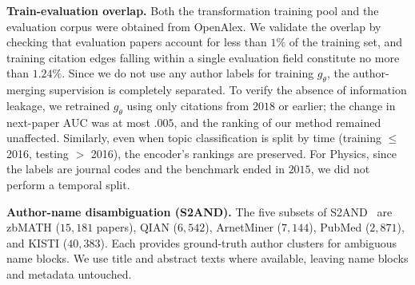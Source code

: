 \textbf{Train-evaluation overlap.}
Both the transformation training pool and the evaluation corpus were obtained from OpenAlex. 
We validate the overlap by checking that evaluation papers account for less than $1\%$ of the training set, and training citation edges falling within a single evaluation field constitute no more than $1.24\%$. Since we do not use any author labels for training $g_\theta$, the author-merging supervision is completely separated. To verify the absence of information leakage, we retrained $g_\theta$ using only citations from $2018$ or earlier; the change in next-paper AUC was at most $.005$, and the ranking of our method remained unaffected. Similarly, even when topic classification is split by time (training $\leq$ 2016, testing $>$ 2016), the encoder's rankings are preserved. For Physics, since the labels are journal codes and the benchmark ended in $2015$, we did not perform a temporal split.

\textbf{Author-name disambiguation (S2AND).}
The five subsets of S2AND~\citep{subramanian2021s2and} are zbMATH ($15{,}181$ papers), QIAN ($6{,}542$), ArnetMiner ($7{,}144$), PubMed ($2{,}871$), and KISTI ($40{,}383$).
Each provides ground-truth author clusters for ambiguous name blocks.
We use title and abstract texts where available, leaving name blocks and metadata untouched.
